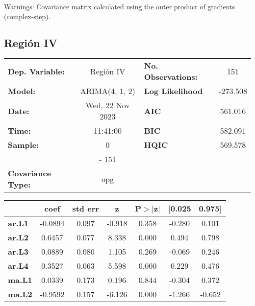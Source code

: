 \documentclass{article}%
\begin{document}
Warnings: \newline
 [1] Covariance matrix calculated using the outer product of gradients (complex-step).%
\subsection*{Región IV}%
\begin{center}
\begin{tabular}{lclc}
\toprule
\textbf{Dep. Variable:}          &    Región IV     & \textbf{  No. Observations:  } &    151      \\
\textbf{Model:}                  &  ARIMA(4, 1, 2)  & \textbf{  Log Likelihood     } &  -273.508   \\
\textbf{Date:}                   & Wed, 22 Nov 2023 & \textbf{  AIC                } &  561.016    \\
\textbf{Time:}                   &     11:41:00     & \textbf{  BIC                } &  582.091    \\
\textbf{Sample:}                 &        0         & \textbf{  HQIC               } &  569.578    \\
\textbf{}                        &       - 151      & \textbf{                     } &             \\
\textbf{Covariance Type:}        &       opg        & \textbf{                     } &             \\
\bottomrule
\end{tabular}
\begin{tabular}{lcccccc}
                & \textbf{coef} & \textbf{std err} & \textbf{z} & \textbf{P$> |$z$|$} & \textbf{[0.025} & \textbf{0.975]}  \\
\midrule
\textbf{ar.L1}  &      -0.0894  &        0.097     &    -0.918  &         0.358        &       -0.280    &        0.101     \\
\textbf{ar.L2}  &       0.6457  &        0.077     &     8.338  &         0.000        &        0.494    &        0.798     \\
\textbf{ar.L3}  &       0.0889  &        0.080     &     1.105  &         0.269        &       -0.069    &        0.246     \\
\textbf{ar.L4}  &       0.3527  &        0.063     &     5.598  &         0.000        &        0.229    &        0.476     \\
\textbf{ma.L1}  &       0.0339  &        0.173     &     0.196  &         0.844        &       -0.304    &        0.372     \\
\textbf{ma.L2}  &      -0.9592  &        0.157     &    -6.126  &         0.000        &       -1.266    &       -0.652     \\

\end{tabular}
\end{center}
\end{document}
